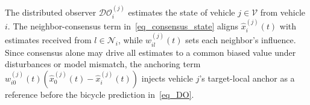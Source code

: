 \documentclass[letterpaper,journal]{IEEEtran}
\def\col#1{\mathop{{\rm col}\,\left(\,#1\,\right)}}
\def\N{\mathcal{N}} %
\def\DO{\mathcal{DO}} %
\begin{document}
The distributed observer $\DO_i^{(j)}$ estimates the state of vehicle $j \in \mathcal{V}$ from vehicle $i$.
The neighbor-consensus term in~\eqref{eq_consensus_state} aligns $\hat{x}_i^{(j)}(t)$ with estimates received from $l \in \N_i$, while $w_{il}^{(j)}(t)$ sets each neighbor's influence. Since consensus alone may drive all estimates to a common biased value under disturbances or model mismatch, the anchoring term $w_{i0}^{(j)}(t)(\hat{x}_0^{(j)}(t)-\hat{x}_i^{(j)}(t))$ injects vehicle $j$'s target-local anchor as a reference before the bicycle prediction in~\eqref{eq_DO}. 


\end{document}
